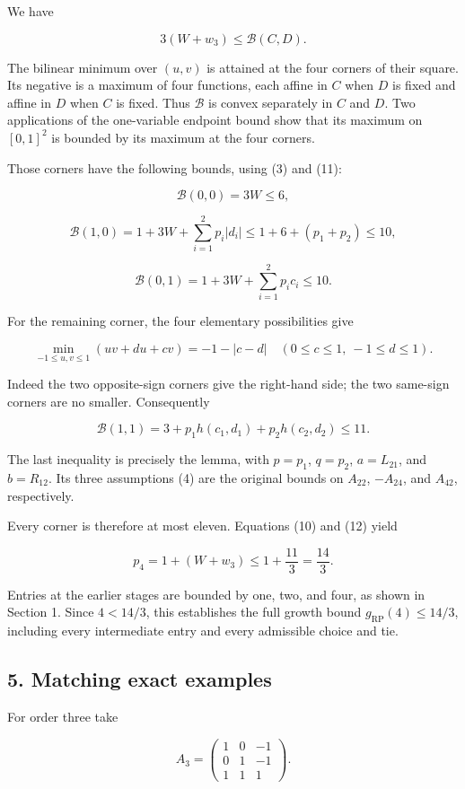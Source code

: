 \documentclass[10pt,a4paper]{article}
\begin{document}
We have

\[
3(W+w_3)\le\mathcal B(C,D).
\tag{12}
\]

The bilinear minimum over \((u,v)\) is attained at the four corners of
their square. Its negative is a maximum of four functions, each affine
in \(C\) when \(D\) is fixed and affine in \(D\) when \(C\) is fixed.
Thus \(\mathcal B\) is convex separately in \(C\) and \(D\). Two
applications of the one-variable endpoint bound show that its maximum on
\([0,1]^2\) is bounded by its maximum at the four corners.

Those corners have the following bounds, using (3) and (11):

\[
\mathcal B(0,0)=3W\le6,
\]

\[
\mathcal B(1,0)=1+3W+\sum_{i=1}^2p_i|d_i|
\le1+6+(p_1+p_2)\le10,
\]

\[
\mathcal B(0,1)=1+3W+\sum_{i=1}^2p_i c_i\le10.
\]

For the remaining corner, the four elementary possibilities give

\[
\min_{-1\le u,v\le1}(uv+du+cv)=-1-|c-d|
\quad(0\le c\le1,\ -1\le d\le1).
\]

Indeed the two opposite-sign corners give the right-hand side; the two
same-sign corners are no smaller. Consequently

\[
\mathcal B(1,1)=3+p_1h(c_1,d_1)+p_2h(c_2,d_2)\le11.
\tag{13}
\]

The last inequality is precisely the lemma, with \(p=p_1\), \(q=p_2\),
\(a=L_{21}\), and \(b=R_{12}\). Its three assumptions (4) are the
original bounds on \(A_{22}\), \(-A_{24}\), and \(A_{42}\),
respectively.

Every corner is therefore at most eleven. Equations (10) and (12) yield

\[
p_4=1+(W+w_3)\le1+\frac{11}{3}=\frac{14}{3}.
\]

Entries at the earlier stages are bounded by one, two, and four, as
shown in Section 1. Since \(4<14/3\), this establishes the full growth
bound \(g_{\mathrm{RP}}(4)\le14/3\), including every intermediate entry
and every admissible choice and tie.

\subsection{5. Matching exact examples}\label{matching-exact-examples}

For order three take

\[
A_3=\begin{pmatrix}1&0&-1\\0&1&-1\\1&1&1\end{pmatrix}.
\]
\end{document}
